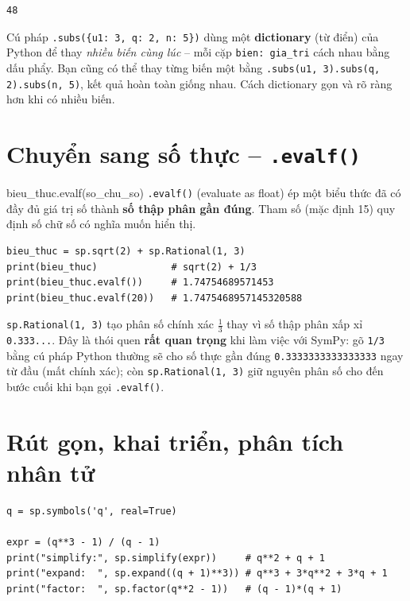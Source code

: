 \documentclass[12pt,a4paper]{report}
\newcommand{\pycmd}[1]{\texttt{\color{kw}#1}}
\begin{document}
\begin{lstlisting}[style=outstyle,numbers=none]
48
\end{lstlisting}

\begin{infobox}
Cú pháp \texttt{.subs(\{u1: 3, q: 2, n: 5\})} dùng một \textbf{dictionary}
(từ điển) của Python để thay \emph{nhiều biến cùng lúc} -- mỗi cặp
\texttt{bien: gia\_tri} cách nhau bằng dấu phẩy. Bạn cũng có thể thay
từng biến một bằng \texttt{.subs(u1, 3).subs(q, 2).subs(n, 5)}, kết quả
hoàn toàn giống nhau. Cách dictionary gọn và rõ ràng hơn khi có nhiều
biến.
\end{infobox}

\section{Chuyển sang số thực -- \texttt{.evalf()}}

\begin{syntaxbox}{bieu\_thuc.evalf(so\_chu\_so)}
\texttt{.evalf()} (evaluate as float) ép một biểu thức đã có đầy đủ giá
trị số thành \textbf{số thập phân gần đúng}. Tham số (mặc định 15) quy
định số chữ số có nghĩa muốn hiển thị.
\end{syntaxbox}

\begin{lstlisting}[caption={Chuyển sang số thập phân}]
bieu_thuc = sp.sqrt(2) + sp.Rational(1, 3)
print(bieu_thuc)             # sqrt(2) + 1/3
print(bieu_thuc.evalf())     # 1.74754689571453
print(bieu_thuc.evalf(20))   # 1.7475468957145320588
\end{lstlisting}

\begin{infobox}
\pycmd{sp.Rational(1, 3)} tạo phân số chính xác $\tfrac13$ thay vì số
thập phân xấp xỉ \texttt{0.333...}. Đây là thói quen \textbf{rất quan
trọng} khi làm việc với SymPy: gõ \texttt{1/3} bằng cú pháp Python
thường sẽ cho số thực gần đúng \texttt{0.3333333333333333} ngay từ đầu
(mất chính xác); còn \texttt{sp.Rational(1, 3)} giữ nguyên phân số cho
đến bước cuối khi bạn gọi \texttt{.evalf()}.
\end{infobox}

\section{Rút gọn, khai triển, phân tích nhân tử}

\begin{lstlisting}[caption={Các lệnh biến đổi biểu thức}]
q = sp.symbols('q', real=True)

expr = (q**3 - 1) / (q - 1)
print("simplify:", sp.simplify(expr))     # q**2 + q + 1
print("expand:  ", sp.expand((q + 1)**3)) # q**3 + 3*q**2 + 3*q + 1
print("factor:  ", sp.factor(q**2 - 1))   # (q - 1)*(q + 1)
\end{lstlisting}
\end{document}
